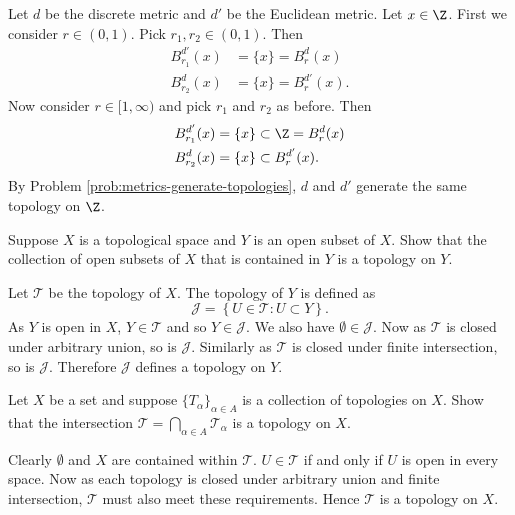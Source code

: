 \begin{solution}
	Let $d$ be the discrete metric and $d'$ be the Euclidean metric.
	Let $x \in \Z$.
	First we consider $r \in (0,1)$. Pick $r_1, r_2 \in (0,1)$. Then
	\begin{align*}
		B_{r_1}^{d'}(x) &= \{x\} = B_r^d(x) \\
		B_{r_2}^d(x)    &= \{x\} = B_r^{d'}(x).
	\end{align*}
	Now consider $r \in [1, \infty)$ and pick $r_1$ and $r_2$ as before.
	Then
	\begin{align*}
		B_{r_1}^{d'}(x) &= \{x\} \subset \Z = B_r^d(x) \\
		B_{r_2}^{d}(x)  &= \{x\} \subset B_r^{d'}(x).
	\end{align*}
	By Problem \ref{prob:metrics-generate-topologies}, $d$ and $d'$
	generate the same topology on $\Z$. 
\end{solution}

\begin{problem}
	Suppose $X$ is a topological space and $Y$ is an open subset of $X$.
	Show that the collection of open subsets of $X$ that is contained in $Y$
	is a topology on $Y$.
\end{problem}

\begin{solution}
	Let $\mathcal T$ be the topology of $X$. The topology of $Y$
	is defined as
	\[
		\mathcal J = \left\{ U \in \mathcal T: U \subset Y \right\}.
	\]
	As $Y$ is open in $X$, $Y \in \mathcal T$ and so $Y \in \mathcal J$.
	We also have $\emptyset \in \mathcal J$.
	Now as $\mathcal T$ is closed under arbitrary union, so is $\mathcal J$.
	Similarly as $\mathcal T$ is closed under finite intersection, 
	so is $\mathcal J$.
	Therefore $\mathcal J$ defines a topology on $Y$.
\end{solution}

\begin{problem}
	Let $X$ be a set and suppose $ \{ T_\alpha \}_{\alpha \in A} $ is a
	collection of topologies on $X$.
	Show that the intersection $
		\mathcal T = \bigcap_{\alpha\in A} \mathcal T_\alpha
	$
	is a topology on $X$.
\end{problem}

\begin{solution}
	Clearly $\emptyset$ and $X$ are contained within $\mathcal T$.
	$U \in \mathcal T$ if and only if $U$ is open in every space.
	Now as each topology is closed under arbitrary union and finite
	intersection, $\mathcal T$ must also meet these requirements.
	Hence $\mathcal T$ is a topology on $X$.
\end{solution}
